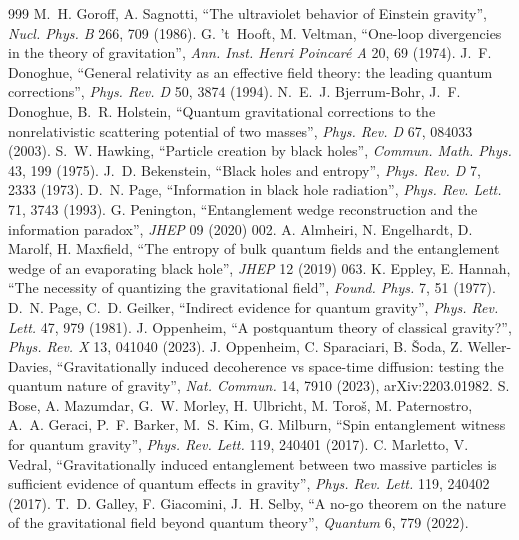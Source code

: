 \documentclass[11pt,a4paper]{article}
\theoremstyle{definition}
\theoremstyle{remark}
\theoremstyle{definition}
\begin{document}
\begin{thebibliography}{999}\small
{} M.~H. Goroff, A. Sagnotti, ``The ultraviolet behavior of Einstein gravity'', \emph{Nucl. Phys. B} 266, 709 (1986).
 G. 't~Hooft, M. Veltman, ``One-loop divergencies in the theory of gravitation'', \emph{Ann. Inst. Henri
Poincar\'e A} 20, 69 (1974).
 J.~F. Donoghue, ``General relativity as an effective field theory: the leading quantum corrections'', \emph{Phys. Rev.
D} 50, 3874 (1994).
 N.~E.~J. Bjerrum-Bohr, J.~F. Donoghue, B.~R. Holstein, ``Quantum gravitational corrections to the nonrelativistic
scattering potential of two masses'', \emph{Phys. Rev. D} 67, 084033 (2003).
 S.~W. Hawking, ``Particle creation by black holes'', \emph{Commun. Math. Phys.} 43, 199 (1975).
 J.~D. Bekenstein, ``Black holes and entropy'', \emph{Phys. Rev. D} 7, 2333 (1973).
 D.~N. Page, ``Information in black hole radiation'', \emph{Phys. Rev. Lett.} 71, 3743 (1993).
 G. Penington, ``Entanglement wedge reconstruction and the information paradox'', \emph{JHEP} 09 (2020) 002.
 A. Almheiri, N. Engelhardt, D. Marolf, H. Maxfield, ``The entropy of bulk quantum fields and the entanglement wedge of an
evaporating black hole'', \emph{JHEP} 12 (2019) 063.
 K. Eppley, E. Hannah, ``The necessity of quantizing the gravitational field'', \emph{Found. Phys.} 7, 51 (1977).
 D.~N. Page, C.~D. Geilker, ``Indirect evidence for quantum gravity'', \emph{Phys. Rev. Lett.} 47, 979 (1981).
 J. Oppenheim, ``A postquantum theory of classical gravity?'', \emph{Phys. Rev. X} 13, 041040 (2023).
 J. Oppenheim, C. Sparaciari, B. \v{S}oda, Z. Weller-Davies, ``Gravitationally induced decoherence vs space-time diffusion:
testing the quantum nature of gravity'', \emph{Nat. Commun.} 14, 7910 (2023), arXiv:2203.01982.
 S. Bose, A. Mazumdar, G.~W. Morley, H. Ulbricht, M. Toro\v{s}, M. Paternostro, A.~A. Geraci, P.~F. Barker, M.~S. Kim, G.
Milburn, ``Spin entanglement witness for quantum gravity'', \emph{Phys. Rev. Lett.} 119, 240401 (2017).
 C. Marletto, V. Vedral, ``Gravitationally induced entanglement between two massive particles is sufficient evidence of
quantum effects in gravity'', \emph{Phys. Rev. Lett.} 119, 240402 (2017).
 T.~D. Galley, F. Giacomini, J.~H. Selby, ``A no-go theorem on the nature of the gravitational field beyond quantum
theory'', \emph{Quantum} 6, 779 (2022).

\end{thebibliography}
\end{document}
